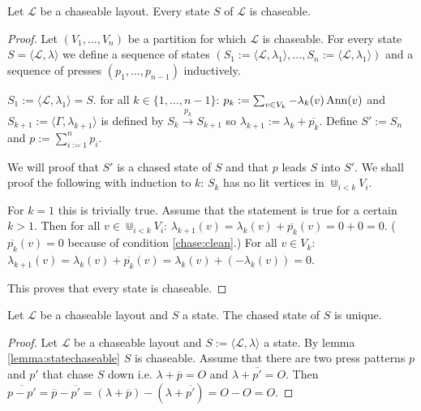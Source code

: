 \begin{lemma}\label{lemma:statechaseable}
	Let $\mathcal{L}$ be a chaseable layout. Every state $S$ of
	$\mathcal{L}$ is chaseable.
\end{lemma}

\begin{proof}
	Let $(V_{1},\ldots,V_{n})$ be a partition for which $\mathcal{L}$ is
	chaseable. For every state $S=\langle\mathcal{L},\lambda\rangle$ we
	define a sequence of states $(S_{1} := \langle\mathcal{L},
	\lambda_{1}\rangle ,\ldots,S_{n} := \langle\mathcal{L},
	\lambda_{1}\rangle)$ and a sequence of presses $(p_{1},\ldots,p_{n-1})$
	inductively.
	
	$S_{1}:= \langle\mathcal{L},\lambda_{1}\rangle = S$. for all
	$k\in\{1,\ldots,n-1\}$: $p_{k} := \sum_{v\in V_{k}}
	-\lambda_{k}(v)\operatorname{Ann}(v)$ and $S_{k+1}:=\langle\Gamma, \lambda_{k+1}\rangle$
	is defined by $S_{k} \overset{p_{k}}{\rightarrow} S_{k+1}$ so
	$\lambda_{k+1}:=\lambda_{k}+\overline{p_{k}}$. Define $S':=S_{n}$ and
	$p:=\sum_{i:=1}^{n} p_{i}$.
	
	We will proof that $S'$ is a chased state of $S$ and that $p$ leads $S$
	into $S'$. We shall proof the following with induction to $k$: $S_{k}$
	has no lit vertices in $\Cup_{i<k} V_{i}$.
	
	For $k=1$ this is trivially true. Assume that the statement is true for a
	certain $k>1$. Then for all $v\in\Cup_{i<k} V_{i}$: $\lambda_{k+1}(v) =
	\lambda_{k}(v) + \overline{p_{k}}(v) = 0 + 0 = 0$. ($\overline{p_{k}}(v)
	= 0$ because of condition \ref{chase:clean}.) For all $v\in V_{k}$:
	$\lambda_{k+1}(v) = \lambda_{k}(v) + \overline{p_{k}}(v) =
	\lambda_{k}(v) + (-\lambda_{k}(v)) = 0$.
	
	This proves that every state is chaseable.
\end{proof}

\begin{lemma}
	Let $\mathcal{L}$ be a chaseable layout and $S$ a state. The chased
	state of $S$ is unique.
\end{lemma}

\begin{proof}
	Let $\mathcal{L}$ be a chaseable layout and $S := \langle \mathcal{L},
	\lambda \rangle$ a state. By lemma \ref{lemma:statechaseable} $S$ is
	chaseable. Assume that there are two press patterns $p$ and $p'$ that
	chase $S$ down i.e. $\lambda + \overline{p} = O$ and $\lambda +
	\overline{p'} = O$. Then $\overline{p-p'} = \overline{p} - \overline{p'}
	= (\lambda + \overline{p}) - (\lambda + \overline{p'}) = O - O = O$.
\end{proof}

